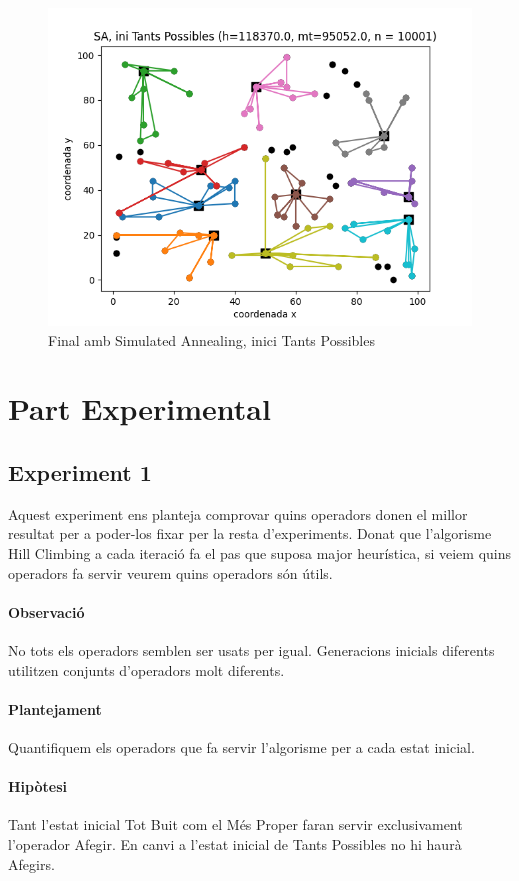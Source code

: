 \documentclass[a4paper]{article}
\begin{document}
\begin{figure}[htp]
\centering
\includegraphics[scale=0.65]{images/fig11.png}
\caption{Final amb Simulated Annealing, inici Tants Possibles}
\centering
\end{figure}

\newpage
\section{Part Experimental}

\subsection{Experiment 1}
Aquest experiment ens planteja comprovar quins operadors donen el millor resultat per a poder-los fixar per la resta d'experiments. Donat que l'algorisme Hill Climbing a cada iteració fa el pas que suposa major heurística, si veiem quins operadors fa servir veurem quins operadors són útils.
\paragraph{Observació} No tots els operadors semblen ser usats per igual. Generacions inicials diferents utilitzen conjunts d'operadors molt diferents.
\paragraph{Plantejament} Quantifiquem els operadors que fa servir l'algorisme per a cada estat inicial.
\paragraph{Hipòtesi} Tant l'estat inicial Tot Buit com el Més Proper faran servir exclusivament l'operador Afegir. En canvi a l'estat inicial de Tants Possibles no hi haurà Afegirs.
\end{document}
